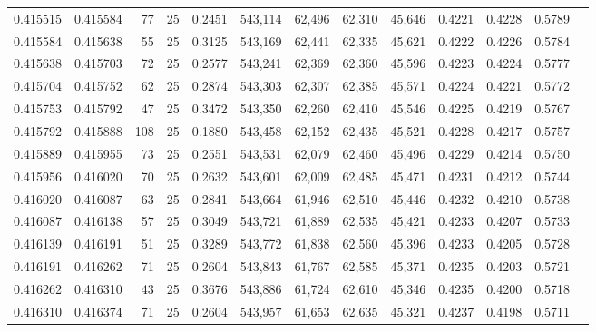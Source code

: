 \begin{tabular}{rrrrrrrrrrrrr}
0.415515 & 0.415584 &    77 &  25 &                                     0.2451 & 543,114 &  62,496 &  62,310 &  45,646 & 0.4221 & 0.4228 & 0.5789 \\
0.415584 & 0.415638 &    55 &  25 &                                     0.3125 & 543,169 &  62,441 &  62,335 &  45,621 & 0.4222 & 0.4226 & 0.5784 \\
0.415638 & 0.415703 &    72 &  25 &                                     0.2577 & 543,241 &  62,369 &  62,360 &  45,596 & 0.4223 & 0.4224 & 0.5777 \\
0.415704 & 0.415752 &    62 &  25 &                                     0.2874 & 543,303 &  62,307 &  62,385 &  45,571 & 0.4224 & 0.4221 & 0.5772 \\
0.415753 & 0.415792 &    47 &  25 &                                     0.3472 & 543,350 &  62,260 &  62,410 &  45,546 & 0.4225 & 0.4219 & 0.5767 \\
0.415792 & 0.415888 &   108 &  25 &                                     0.1880 & 543,458 &  62,152 &  62,435 &  45,521 & 0.4228 & 0.4217 & 0.5757 \\
0.415889 & 0.415955 &    73 &  25 &                                     0.2551 & 543,531 &  62,079 &  62,460 &  45,496 & 0.4229 & 0.4214 & 0.5750 \\
0.415956 & 0.416020 &    70 &  25 &                                     0.2632 & 543,601 &  62,009 &  62,485 &  45,471 & 0.4231 & 0.4212 & 0.5744 \\
0.416020 & 0.416087 &    63 &  25 &                                     0.2841 & 543,664 &  61,946 &  62,510 &  45,446 & 0.4232 & 0.4210 & 0.5738 \\
0.416087 & 0.416138 &    57 &  25 &                                     0.3049 & 543,721 &  61,889 &  62,535 &  45,421 & 0.4233 & 0.4207 & 0.5733 \\
0.416139 & 0.416191 &    51 &  25 &                                     0.3289 & 543,772 &  61,838 &  62,560 &  45,396 & 0.4233 & 0.4205 & 0.5728 \\
0.416191 & 0.416262 &    71 &  25 &                                     0.2604 & 543,843 &  61,767 &  62,585 &  45,371 & 0.4235 & 0.4203 & 0.5721 \\
0.416262 & 0.416310 &    43 &  25 &                                     0.3676 & 543,886 &  61,724 &  62,610 &  45,346 & 0.4235 & 0.4200 & 0.5718 \\
0.416310 & 0.416374 &    71 &  25 &                                     0.2604 & 543,957 &  61,653 &  62,635 &  45,321 & 0.4237 & 0.4198 & 0.5711 \\

\end{tabular}
